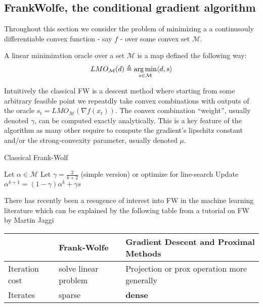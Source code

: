 \subsection{Frank\-Wolfe, the conditional gradient algorithm}
Throughout this section we consider the problem of minimizing a
a continusouly differentiable convex function - say $f$ - over some convex set
$\mathcal M$.
\begin{definition}
  A linear minimization oracle over a set $\mathcal M$ is a map defined the following way:
  \begin{equation}
    LMO_{\mathcal{M}}(d) \triangleq \operatorname*{\arg\min}_{s \in\mathcal{M}}\langle d, s \rangle
    \label{eq:lmo}
  \end{equation}
\end{definition}


Intuitively the classical FW is a descent method where starting from some
arbitrary feasible point we repeatdly take convex combinations with outputs of
the oracle $s_{t}= LMO_{\mathcal{M}}(\nabla f(x_{t}))$. 
The convex combination ``weight'', usually denoted $\gamma$,
can be computed exactly analytically. This is a key feature of the algorithm
as many other require to compute the gradient's lipschitz constant and/or the
strong-convexity parameter, usually denoted $\mu$.

\begin{algorithm}[htbp!]
  \caption{Classical Frank-Wolf}
  \label{alg:fw}
\begin{algorithmic}
   \STATE Let $\alpha\in\mathcal{M}$
   \STATE Let $\gamma = \frac{2}{k+2}$ (simple version) or optimize for line-search
   \STATE Update $\alpha^{k+1}= (1-\gamma)\alpha^{k}+ \gamma s$
   \ENDFOR
\end{algorithmic}
\end{algorithm}

There has recently been a resugence of interest into FW in the machine learning
literature which can be explained by the following table from a tutorial on FW
by Martin Jaggi \citet{jaggiFrankWolfeOptimizationAlgorithms2014}
\begin{table}[htbp!]
  \center
  \begin{tabular}{|l|l|l|}
  \hline
  & Frank-Wolfe & Gradient Descent and Proximal Methods\\
  \hline
  Iteration cost & solve linear problem & Projection or prox operation more generally\\
  \hline
  Iterates & sparse & \textbf{dense}\\
  \hline
  \end{tabular}
\end{table}

